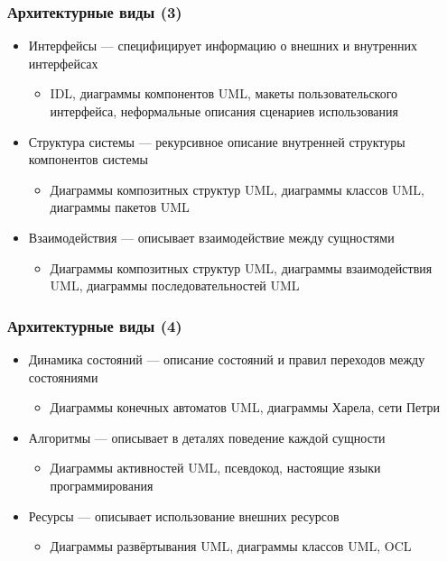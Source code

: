 \documentclass[xetex,mathserif,serif]{beamer}
\begin{document}
	\begin{frame}
		\frametitle{Архитектурные виды (3)}
		\begin{itemize}
			\item Интерфейсы --- специфицирует информацию о внешних и внутренних интерфейсах
			\begin{itemize}
				\item IDL, диаграммы компонентов UML, макеты пользовательского интерфейса, неформальные описания сценариев использования
			\end{itemize}
			\item Структура системы --- рекурсивное описание внутренней структуры компонентов системы
			\begin{itemize}
				\item Диаграммы композитных структур UML, диаграммы классов UML, диаграммы пакетов UML
			\end{itemize}
			\item Взаимодействия --- описывает взаимодействие между сущностями
			\begin{itemize}
				\item Диаграммы композитных структур UML, диаграммы взаимодействия UML, диаграммы последовательностей UML
			\end{itemize}
		\end{itemize}
	\end{frame}

	\begin{frame}
		\frametitle{Архитектурные виды (4)}
		\begin{itemize}
			\item Динамика состояний --- описание состояний и правил переходов между состояниями
			\begin{itemize}
				\item Диаграммы конечных автоматов UML, диаграммы Харела, сети Петри
			\end{itemize}
			\item Алгоритмы --- описывает в деталях поведение каждой сущности
			\begin{itemize}
				\item Диаграммы активностей UML, псевдокод, настоящие языки программирования
			\end{itemize}
			\item Ресурсы --- описывает использование внешних ресурсов
			\begin{itemize}
				\item Диаграммы развёртывания UML, диаграммы классов UML, OCL
			\end{itemize}
		\end{itemize}
	\end{frame}
\end{document}
